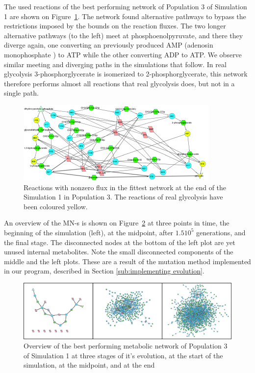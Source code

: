 \documentclass[a4paper,12pt]{article}
\begin{document}
The used reactions of the best performing network of Population 3 of Simulation 1 are shown on Figure~\ref{fig:trunk_glyc_final_job1}. The network found alternative pathways to bypass the restrictions imposed by the bounds on the reaction fluxes. The two longer alternative pathways (to the left) meet at phosphoenolpyruvate, and there they diverge again, one converting an previously produced AMP (adenosin monophosphate ) to ATP while the other converting ADP to ATP. We observe similar meeting and diverging paths in the simulations that follow. In real glycolysis 3-phosphorglycerate is isomerized to 2-phosphorglycerate, this network therefore performs almost all reactions that real glycolysis does, but not in a single path. 



\begin{figure}[htpb]
	\centering
	\includegraphics[width=1\linewidth]{trunk_glyc_final_job1_colored.pdf}
	\caption{Reactions with nonzero flux in the fittest network at the end of the Simulation 1 in Population 3. The reactions of real glycolysis have been coloured yellow. }
	\label{fig:trunk_glyc_final_job1}
\end{figure}


An overview of the MN-s is shown on Figure~\ref{fig:init-mid-final} at three points in time, the beginning of the simulation (left), at the midpoint, after $1.5 10^5$ generations, and the final stage. The disconnected nodes at the bottom of the left plot are yet unused internal metabolites. Note the small disconnected components of the middle and the left plots. These are a result of the mutation method implemented in our program, described in Section \ref{sub:implementing evolution}. 

\begin{figure}[htpb]
	\centering
	\includegraphics[width=1\linewidth]{init-mid-final.png}
	\caption{Overview of the best performing metabolic network of Population 3 of Simulation 1 at three stages of it's evolution, at the start of the simulation, at the midpoint, and at the end}
	\label{fig:init-mid-final}
\end{figure}
\end{document}
